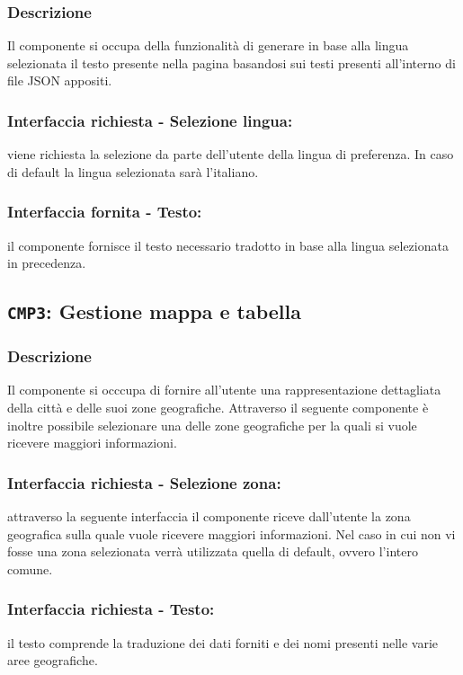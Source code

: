         \subsubsection{Descrizione} 
            Il componente si occupa della funzionalità di generare in base alla lingua selezionata il testo presente nella pagina basandosi sui testi presenti all'interno di file JSON appositi.
        \subsubsection{Interfaccia richiesta - Selezione lingua:}
            viene richiesta la selezione da parte dell'utente della lingua di preferenza.
            In caso di default la lingua selezionata sarà l'italiano.
        \subsubsection{Interfaccia fornita - Testo:}
            il componente fornisce il testo necessario tradotto in base alla lingua selezionata in precedenza.

    \subsection{\texttt{CMP3}: Gestione mappa e tabella}
        \subsubsection{Descrizione}
            Il componente si occcupa di fornire all'utente una rappresentazione dettagliata della città e delle suoi zone geografiche. Attraverso il seguente componente è inoltre possibile selezionare una delle zone geografiche per la quali si vuole ricevere maggiori informazioni. 
        \subsubsection{Interfaccia richiesta - Selezione zona:}
            attraverso la seguente interfaccia il componente riceve dall'utente la zona geografica sulla quale vuole ricevere maggiori informazioni. Nel caso in cui non vi fosse una zona selezionata verrà utilizzata quella di default, ovvero l'intero comune.
        \subsubsection{Interfaccia richiesta - Testo:}
            il testo comprende la traduzione dei dati forniti e dei nomi presenti nelle varie aree geografiche.
